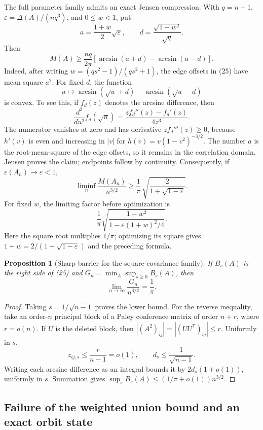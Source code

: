 \documentclass[11pt]{article}
\newtheorem{proposition}[theorem]{Proposition}
\begin{document}
The full parameter family admits an exact Jensen compression.  With
$q=n-1$, $\varepsilon=\Delta(A)/(nq^3)$, and $0\le w<1$, put
\[
 a=\frac{1+w}{2}\sqrt\varepsilon,\qquad
 d=\frac{\sqrt{1-w^2}}{\sqrt q}.
\]
Then
\[
 M(A)\ge\frac{nq}{2\pi}
 [\arcsin(a+d)-\arcsin(a-d)].
\]
Indeed, after writing $w=(qs^2-1)/(qs^2+1)$, the edge offsets in (25)
have mean square $a^2$.  For fixed $d$, the function
\[
 u\longmapsto
 \arcsin(\sqrt u+d)-\arcsin(\sqrt u-d)
\]
is convex.  To see this, if $f_d(z)$ denotes the arcsine difference, then
\[
 \frac{d^2}{du^2}f_d(\sqrt u)
 =\frac{zf_d''(z)-f_d'(z)}{4z^3}.
\]
The numerator vanishes at zero and has derivative $zf_d'''(z)\ge0$,
because $h'(v)$ is even and increasing in $|v|$ for
$h(v)=v(1-v^2)^{-3/2}$.  The number $a$ is the root-mean-square of the
edge offsets, so it remains in the correlation domain.  Jensen proves the
claim; endpoints follow by continuity.  Consequently, if
$\varepsilon(A_n)\to\varepsilon<1$,
\[
 \liminf_n\frac{M(A_n)}{n^{3/2}}
 \ge\frac1\pi\,
 \sqrt{\frac{2}{1+\sqrt{1-\varepsilon}}}.
\]
For fixed $w$, the limiting factor before optimization is
\[
 \frac1\pi
 \sqrt{\frac{1-w^2}{1-\varepsilon(1+w)^2/4}}.
\]
Here the square root multiplies $1/\pi$; optimizing its square gives
$1+w=2/(1+\sqrt{1-\varepsilon})$ and the preceding formula.

\begin{proposition}[Sharp barrier for the square-covariance family]
\label{prop:nonlinear-barrier}
If $B_s(A)$ is the right side of (25) and
$G_n=\min_A\sup_{s\ge0}B_s(A)$, then
\[
 \lim_{n\to\infty}\frac{G_n}{n^{3/2}}=\frac1\pi.
\]
\end{proposition}

\begin{proof}
Taking $s=1/\sqrt{n-1}$ proves the lower bound.  For the reverse inequality,
take an order-$n$ principal block of a Paley conference matrix of order
$n+r$, where $r=o(n)$.  If $U$ is the deleted block, then
$|(A^2)_{ij}|=|(UU^{\mathsf T})_{ij}|\le r$.  Uniformly in $s$,
\[
 z_{ij,s}\le\frac{r}{n-1}=o(1),\qquad
 d_s\le\frac1{\sqrt{n-1}}.
\]
Writing each arcsine difference as an integral bounds it by
$2d_s(1+o(1))$, uniformly in $s$.  Summation gives
$\sup_sB_s(A)\le(1/\pi+o(1))n^{3/2}$.
\end{proof}

\subsection{Failure of the weighted union bound and an exact orbit state}
\end{document}
